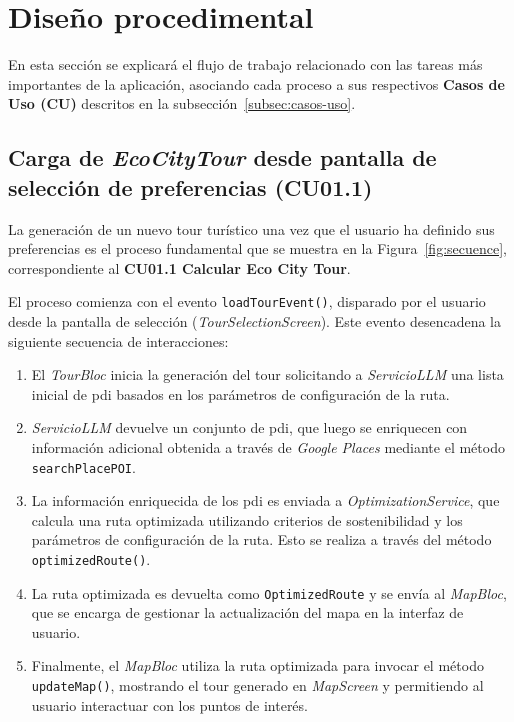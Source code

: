 \section{Diseño procedimental}
En esta sección se explicará el flujo de trabajo relacionado con las tareas más importantes de la aplicación, asociando cada proceso a sus respectivos \textbf{Casos de Uso (CU)} descritos en la subsección~\ref{subsec:casos-uso}.

\subsection{Carga de \textit{EcoCityTour} desde pantalla de selección de preferencias (CU01.1)}
La generación de un nuevo tour turístico una vez que el usuario ha definido sus preferencias es el proceso fundamental que se muestra en la Figura~\ref{fig:secuence}, correspondiente al \textbf{CU01.1 Calcular Eco City Tour}.

El proceso comienza con el evento \texttt{loadTourEvent()}, disparado por el usuario desde la pantalla de selección (\textit{TourSelectionScreen}). Este evento desencadena la siguiente secuencia de interacciones:
\begin{enumerate}
	\item El \textit{TourBloc} inicia la generación del tour solicitando a \textit{ServicioLLM} una lista inicial de \acrlong{pdi} basados en los parámetros de configuración de la ruta.
	\item \textit{ServicioLLM} devuelve un conjunto de \acrlong{pdi}, que luego se enriquecen con información adicional obtenida a través de \textit{Google Places} mediante el método \texttt{searchPlacePOI}.
	\item La información enriquecida de los \acrlong{pdi} es enviada a \textit{OptimizationService}, que calcula una ruta optimizada utilizando criterios de sostenibilidad y los parámetros de configuración de la ruta. Esto se realiza a través del método \texttt{optimizedRoute()}.
	\item La ruta optimizada es devuelta como \texttt{OptimizedRoute} y se envía al \textit{MapBloc}, que se encarga de gestionar la actualización del mapa en la interfaz de usuario.
	\item Finalmente, el \textit{MapBloc} utiliza la ruta optimizada para invocar el método \texttt{updateMap()}, mostrando el tour generado en \textit{MapScreen} y permitiendo al usuario interactuar con los puntos de interés.
\end{enumerate}

